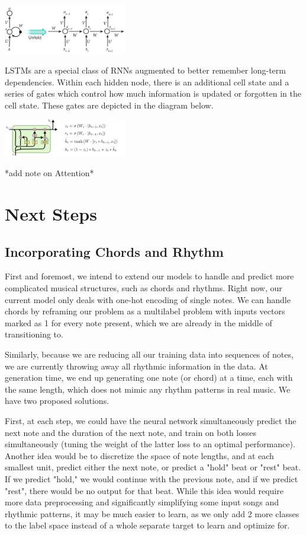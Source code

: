 \documentclass[twoside,twocolumn]{article}
\begin{document}
\includegraphics[width = 0.4\textwidth]{rnn-diagram}

LSTMs are a special class of RNNs augmented to better remember long-term dependencies. Within each hidden node, there is an additional cell state and a series of gates which control how much information is updated or forgotten in the cell state. These gates are depicted in the diagram below.

\includegraphics[width = 0.4\textwidth]{colah-lstm-diagram}

*add note on Attention*


\section{Next Steps}

\subsection{Incorporating Chords and Rhythm}
First and foremost, we intend to extend our models to handle and predict more complicated musical structures, such as chords and rhythms. Right now, our current model only deals with one-hot encoding of single notes. We can handle chords by reframing our problem as a multilabel problem with inputs vectors marked as 1 for every note present, which we are already in the middle of transitioning to.

Similarly, because we are reducing all our training data into sequences of notes, we are currently throwing away all rhythmic information in the data. At generation time, we end up generating one note (or chord) at a time, each with the same length, which does not mimic any rhythm patterns in real music. We have two proposed solutions.

First, at each step, we could have the neural network simultaneously predict the next note and the duration of the next note, and train on both losses simultaneously (tuning the weight of the latter loss to an optimal performance). Another idea would be to discretize the space of note lengths, and at each smallest unit, predict either the next note, or predict a "hold" beat or "rest" beat. If we predict "hold," we would continue with the previous note, and if we predict "rest", there would be no output for that beat. While this idea would require more data preprocessing and significantly simplifying some input songs and rhythmic patterns, it may be much easier to learn, as we only add 2 more classes to the label space instead of a whole separate target to learn and optimize for.
\end{document}
